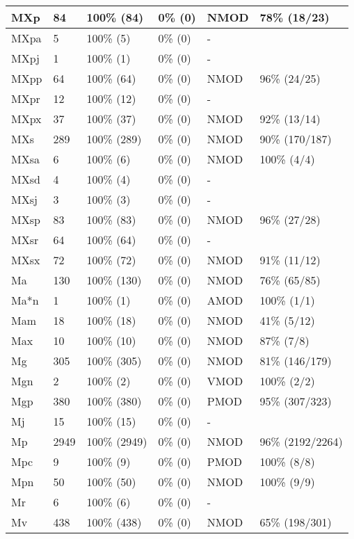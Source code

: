 \begin{figure*}
\begin{tabular}{|l|l|l|l||l|l|}
\hline
 MXp & 84 & 100\% (84) & 0\% (0) & NMOD & 78\% (18/23) \\ 
\hline
 MXpa & 5 & 100\% (5) & 0\% (0) & - &  \\ 
\hline
 MXpj & 1 & 100\% (1) & 0\% (0) & - &  \\ 
\hline
 MXpp & 64 & 100\% (64) & 0\% (0) & NMOD & 96\% (24/25) \\ 
\hline
 MXpr & 12 & 100\% (12) & 0\% (0) & - &  \\ 
\hline
 MXpx & 37 & 100\% (37) & 0\% (0) & NMOD & 92\% (13/14) \\ 
\hline
 MXs & 289 & 100\% (289) & 0\% (0) & NMOD & 90\% (170/187) \\ 
\hline
 MXsa & 6 & 100\% (6) & 0\% (0) & NMOD & 100\% (4/4) \\ 
\hline
 MXsd & 4 & 100\% (4) & 0\% (0) & - &  \\ 
\hline
 MXsj & 3 & 100\% (3) & 0\% (0) & - &  \\ 
\hline
 MXsp & 83 & 100\% (83) & 0\% (0) & NMOD & 96\% (27/28) \\ 
\hline
 MXsr & 64 & 100\% (64) & 0\% (0) & - &  \\ 
\hline
 MXsx & 72 & 100\% (72) & 0\% (0) & NMOD & 91\% (11/12) \\ 
\hline
 Ma & 130 & 100\% (130) & 0\% (0) & NMOD & 76\% (65/85) \\ 
\hline
 Ma*n & 1 & 100\% (1) & 0\% (0) & AMOD & 100\% (1/1) \\ 
\hline
 Mam & 18 & 100\% (18) & 0\% (0) & NMOD & 41\% (5/12) \\ 
\hline
 Max & 10 & 100\% (10) & 0\% (0) & NMOD & 87\% (7/8) \\ 
\hline
 Mg & 305 & 100\% (305) & 0\% (0) & NMOD & 81\% (146/179) \\ 
\hline
 Mgn & 2 & 100\% (2) & 0\% (0) & VMOD & 100\% (2/2) \\ 
\hline
 Mgp & 380 & 100\% (380) & 0\% (0) & PMOD & 95\% (307/323) \\ 
\hline
 Mj & 15 & 100\% (15) & 0\% (0) & - &  \\ 
\hline
 Mp & 2949 & 100\% (2949) & 0\% (0) & NMOD & 96\% (2192/2264) \\ 
\hline
 Mpc & 9 & 100\% (9) & 0\% (0) & PMOD & 100\% (8/8) \\ 
\hline
 Mpn & 50 & 100\% (50) & 0\% (0) & NMOD & 100\% (9/9) \\ 
\hline
 Mr & 6 & 100\% (6) & 0\% (0) & - &  \\ 
\hline
 Mv & 438 & 100\% (438) & 0\% (0) & NMOD & 65\% (198/301) \\ 
\hline
\end{tabular}
\end{figure*}
